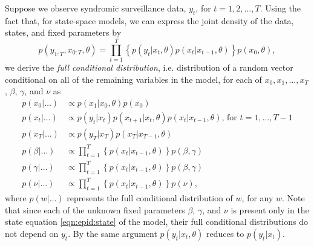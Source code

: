 Suppose we observe syndromic surveillance data, $y_t$, for $t = 1, 2, \ldots, T$. Using the fact that, for state-space models, we can express the joint density of the data, states, and fixed parameters by
\begin{equation}
p(y_{1:T},x_{0:T},\theta) = \prod_{t = 1}^T \left\{p(y_t|x_t,\theta)p(x_t|x_{t-1},\theta)\right\}p(x_0,\theta), \label{eqn:joint}
\end{equation}
we derive the \emph{full conditional distribution}, i.e. distribution of a random vector conditional on all of the remaining variables in the model, for each of $x_0, x_1, \ldots, x_T$, $\beta$, $\gamma$, and $\nu$ as
\begin{align}
p(x_0|\hdots) &\propto p(x_1|x_0,\theta)p(x_0) \label{eqn:epid:fullcond} \\
p(x_t|\hdots) &\propto p(y_t|x_t)p(x_{t+1}|x_t,\theta)p(x_t|x_{t-1},\theta) \mbox{, for } t = 1,\ldots,T-1 \nonumber \\
p(x_T|\hdots) &\propto p(y_T|x_T)p(x_T|x_{T-1},\theta) \nonumber \\
p(\beta|\hdots) &\propto \prod_{t=1}^T \left\{p(x_t|x_{t-1},\theta)\right\}p(\beta, \gamma) \nonumber \\
p(\gamma|\hdots) &\propto \prod_{t=1}^T \left\{p(x_t|x_{t-1},\theta)\right\}p(\beta, \gamma) \nonumber \\
p(\nu|\hdots) &\propto \prod_{t=1}^T \left\{p(x_t|x_{t-1},\theta)\right\}p(\nu), \nonumber
\end{align}
where $p(w|\hdots)$ represents the full conditional distribution of $w$, for any $w$. Note that since each of the unknown fixed parameters $\beta$, $\gamma$, and $\nu$ is present only in the state equation \eqref{eqn:epid:state} of the model, their full conditional distributions do not depend on $y_t$. By the same argument $p(y_t|x_t,\theta)$ reduces to $p(y_t|x_t)$.

